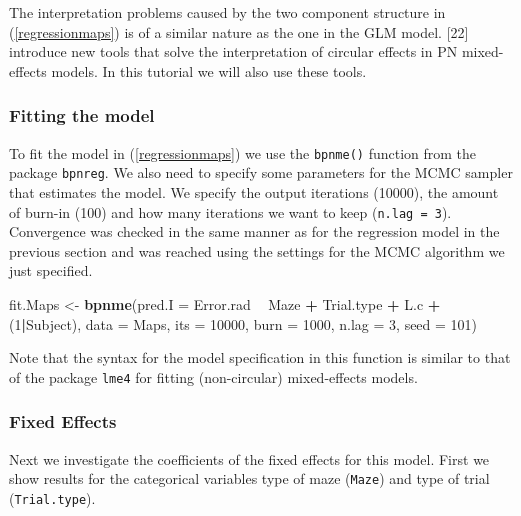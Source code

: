 \documentclass[11pt,]{article}
\newenvironment{Shaded}{\begin{snugshade}}{\end{snugshade}}
\newcommand{\DataTypeTok}[1]{\textcolor[rgb]{0.13,0.29,0.53}{#1}}
\newcommand{\DecValTok}[1]{\textcolor[rgb]{0.00,0.00,0.81}{#1}}
\newcommand{\KeywordTok}[1]{\textcolor[rgb]{0.13,0.29,0.53}{\textbf{#1}}}
\newcommand{\NormalTok}[1]{#1}
\newcommand{\OperatorTok}[1]{\textcolor[rgb]{0.81,0.36,0.00}{\textbf{#1}}}
\newcommand{\StringTok}[1]{\textcolor[rgb]{0.31,0.60,0.02}{#1}}
\begin{document}
The interpretation problems caused by the two component structure in
(\ref{regressionmaps}) is of a similar nature as the one in the GLM
model. {[}22{]} introduce new tools that solve the interpretation of
circular effects in PN mixed-effects models. In this tutorial we will
also use these tools.

\subsubsection{Fitting the model}\label{fitMaps}

To fit the model in (\ref{regressionmaps}) we use the \verb|bpnme()|
function from the package \verb|bpnreg|. We also need to specify some
parameters for the MCMC sampler that estimates the model. We specify the
output iterations (10000), the amount of burn-in (100) and how many
iterations we want to keep (\verb|n.lag = 3|). Convergence was checked
in the same manner as for the regression model in the previous section
and was reached using the settings for the MCMC algorithm we just
specified.

\begin{Shaded}
\begin{Highlighting}[]
\NormalTok{fit.Maps <-}\StringTok{ }\KeywordTok{bpnme}\NormalTok{(}\DataTypeTok{pred.I =}\NormalTok{ Error.rad }\OperatorTok{~}\StringTok{ }\NormalTok{Maze }\OperatorTok{+}\StringTok{ }\NormalTok{Trial.type }\OperatorTok{+}\StringTok{ }\NormalTok{L.c }\OperatorTok{+}\StringTok{ }\NormalTok{(}\DecValTok{1}\OperatorTok{|}\NormalTok{Subject),}
                  \DataTypeTok{data =}\NormalTok{ Maps,}
                  \DataTypeTok{its =} \DecValTok{10000}\NormalTok{, }\DataTypeTok{burn =} \DecValTok{1000}\NormalTok{, }\DataTypeTok{n.lag =} \DecValTok{3}\NormalTok{, }\DataTypeTok{seed =} \DecValTok{101}\NormalTok{)}
\end{Highlighting}
\end{Shaded}

Note that the syntax for the model specification in this function is
similar to that of the package \verb|lme4| for fitting (non-circular)
mixed-effects models.

\subsubsection{Fixed Effects}\label{fixme}

Next we investigate the coefficients of the fixed effects for this
model. First we show results for the categorical variables type of maze
(\verb|Maze|) and type of trial (\verb|Trial.type|).
\end{document}

